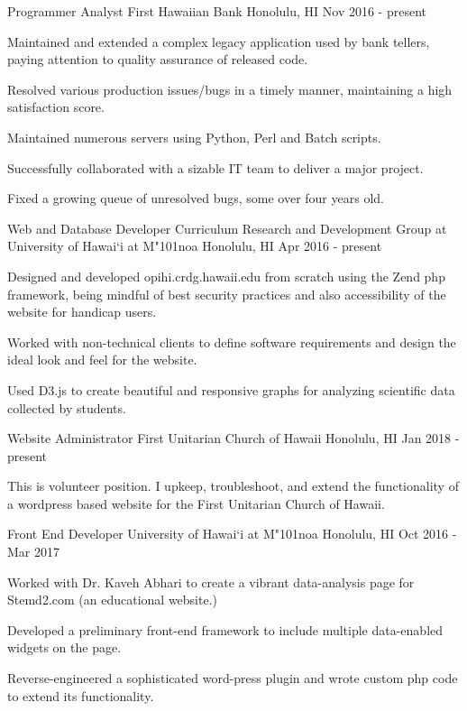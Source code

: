 \begin{cventries}
   	\cventry
    {Programmer Analyst}
    {First Hawaiian Bank}
    {Honolulu, HI}
    {Nov 2016 - present}
    {
        \begin{cvitems}
            \item {Maintained and extended a complex legacy application used by bank tellers, paying attention to quality assurance of released code.}
            \item {Resolved various production issues/bugs in a timely manner, maintaining a high satisfaction score.}
            \item {Maintained numerous servers using Python, Perl and Batch scripts.}
            \item {Successfully collaborated with a sizable IT team to deliver a major project.}
            \item {Fixed a growing queue of unresolved bugs, some over four years old.}
        \end{cvitems}
    }

	\cventry
	{Web and Database Developer}
	{Curriculum Research and Development Group at University of Hawai`i at M{\char"101}noa}
	{Honolulu, HI}
	{Apr 2016 - present}
	{
		\begin{cvitems}
			\item {Designed and developed opihi.crdg.hawaii.edu from scratch using the Zend php framework, being mindful of best security practices and also accessibility of the website for handicap users.}
			\item {Worked with non-technical clients to define software requirements and design the ideal look and feel for the website.}
			\item {Used D3.js to create beautiful and responsive graphs for analyzing scientific data collected by students.}
		\end{cvitems}
	}

	\cventry
	{Website Administrator}
	{First Unitarian Church of Hawaii}
	{Honolulu, HI}
	{Jan 2018 - present}
	{
	\begin{cvitems}
		\item {This is volunteer position. I upkeep, troubleshoot, and extend the functionality of a wordpress based website for the First Unitarian Church of Hawaii.}
	\end{cvitems}
	}

	\cventry
	{Front End Developer}
	{University of Hawai`i at M{\char"101}noa}
	{Honolulu, HI}
	{Oct 2016 - Mar 2017}
	{
		\begin{cvitems}
			\item {Worked with Dr. Kaveh Abhari to create a vibrant data-analysis page for Stemd2.com (an educational website.)}
			\item {Developed a preliminary front-end framework to include multiple data-enabled widgets on the page.}
			\item {Reverse-engineered a sophisticated word-press plugin and wrote custom php code to extend its functionality.}
		\end{cvitems}
	}


\end{cventries}
